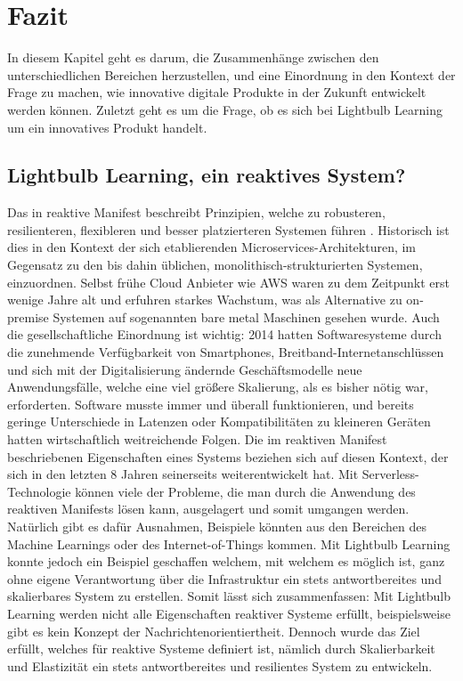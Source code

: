 \chapter{Fazit}

In diesem Kapitel geht es darum, die Zusammenhänge zwischen den unterschiedlichen Bereichen herzustellen, und eine Einordnung in den Kontext der Frage zu machen, wie innovative digitale Produkte in der Zukunft entwickelt werden können. Zuletzt geht es um die Frage, ob es sich bei Lightbulb Learning um ein innovatives Produkt handelt.

\section{Lightbulb Learning, ein reaktives System?}
Das in reaktive Manifest beschreibt Prinzipien, welche zu robusteren, resilienteren, flexibleren und besser platzierteren Systemen führen \cite[vgl.][]{ReactiveManifesto}. Historisch ist dies in den Kontext der sich etablierenden Microservices-Architekturen, im Gegensatz zu den bis dahin üblichen, monolithisch-strukturierten Systemen, einzuordnen. Selbst frühe Cloud Anbieter wie AWS waren zu dem Zeitpunkt erst wenige Jahre alt und erfuhren starkes Wachstum, was als Alternative zu on-premise Systemen auf sogenannten bare metal Maschinen gesehen wurde. Auch die gesellschaftliche Einordnung ist wichtig: 2014 hatten Softwaresysteme durch die zunehmende Verfügbarkeit von Smartphones, Breitband-Internetanschlüssen und sich mit der Digitalisierung ändernde Geschäftsmodelle neue Anwendungsfälle, welche eine viel größere Skalierung, als es bisher nötig war, erforderten. Software musste immer und überall funktionieren, und bereits geringe Unterschiede in Latenzen oder Kompatibilitäten zu kleineren Geräten hatten wirtschaftlich weitreichende Folgen. Die im reaktiven Manifest beschriebenen Eigenschaften eines Systems beziehen sich auf diesen Kontext, der sich in den letzten 8 Jahren seinerseits weiterentwickelt hat. Mit Serverless-Technologie können viele der Probleme, die man durch die Anwendung des reaktiven Manifests lösen kann, ausgelagert und somit umgangen werden. Natürlich gibt es dafür Ausnahmen, Beispiele könnten aus den Bereichen des Machine Learnings oder des Internet-of-Things kommen. Mit Lightbulb Learning konnte jedoch ein Beispiel geschaffen welchem, mit welchem es möglich ist, ganz ohne eigene Verantwortung über die Infrastruktur ein stets antwortbereites und skalierbares System zu erstellen. Somit lässt sich zusammenfassen: Mit Lightbulb Learning werden nicht alle Eigenschaften reaktiver Systeme erfüllt, beispielsweise gibt es kein Konzept der Nachrichtenorientiertheit. Dennoch wurde das Ziel erfüllt, welches für reaktive Systeme definiert ist, nämlich durch Skalierbarkeit und Elastizität ein stets antwortbereites und resilientes System zu entwickeln. 

